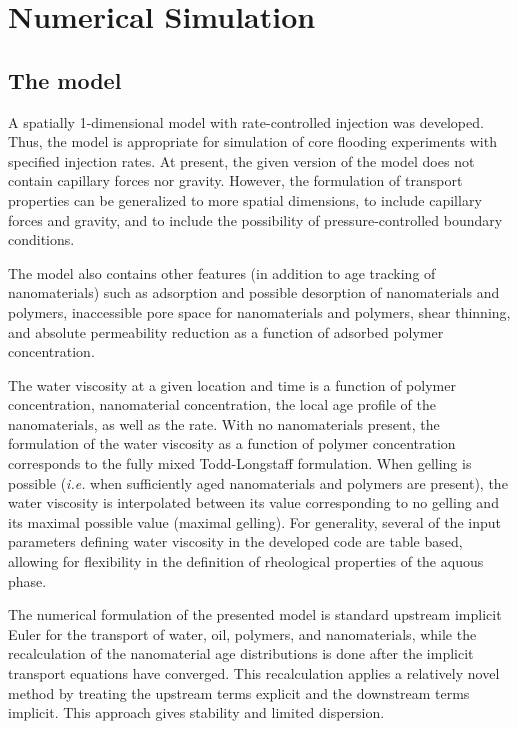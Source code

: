\documentclass[energies,article,submit,moreauthors,pdftex]{Definitions/mdpi}
\begin{document}
\section{Numerical Simulation}
\subsection{The model}
A spatially 1-dimensional model with rate-controlled injection was developed. Thus, the model is appropriate for simulation of core flooding experiments with specified injection rates. At present, the given version of the model does not contain capillary forces nor gravity. However, the formulation of transport properties can be generalized to more spatial dimensions, to include capillary forces and gravity, and to include the possibility of pressure-controlled boundary conditions. 

The model also contains other features (in addition to age tracking of nanomaterials) such as adsorption and possible desorption of nanomaterials and polymers, inaccessible pore space for nanomaterials and polymers, shear thinning, and absolute permeability reduction as a function of adsorbed polymer concentration. 

The water viscosity at a given location and time is a function of polymer concentration, nanomaterial concentration, the local age profile of the nanomaterials, as well as the rate. With no nanomaterials present, the formulation of the water viscosity as a function of polymer concentration corresponds to the fully mixed Todd-Longstaff formulation. When gelling is possible (\textit{i.e.} when sufficiently aged nanomaterials and polymers are present), the water viscosity is interpolated between its value corresponding to no gelling and its maximal possible value (maximal gelling).  For generality, several of the input parameters defining water viscosity in the developed code are table based, allowing for flexibility in the definition of rheological properties of the aquous phase.

The numerical formulation of the presented model is standard upstream implicit Euler for the transport of water, oil, polymers, and nanomaterials, while the recalculation of the nanomaterial age distributions is done after the implicit transport equations have converged. This recalculation applies a relatively novel method \citep{Flatten2008} by treating the upstream terms explicit and the downstream terms implicit. This approach gives stability and limited dispersion. 
\end{document}
